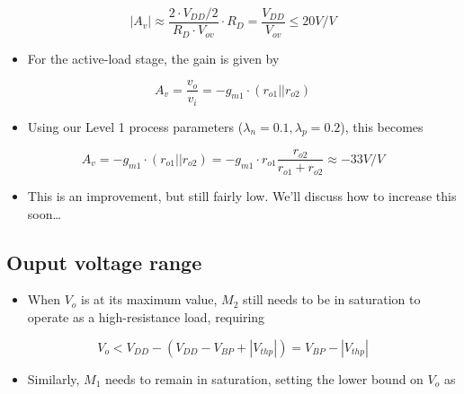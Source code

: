 \documentclass[11pt]{article}
\providecommand{\tightlist}{%
      \setlength{\itemsep}{0pt}\setlength{\parskip}{0pt}}
\begin{document}
\begin{equation}
|A_v| \approx \dfrac{2\cdot V_{DD}/2}{R_D\cdot V_{ov}}\cdot R_D = \dfrac{V_{DD}}{V_{ov}} \leq 20V/V
\end{equation}

\begin{itemize}
\tightlist
\item
  For the active-load stage, the gain is given by
\end{itemize}

\begin{equation}
A_v = \dfrac{v_o}{v_i} = -g_{m1} \cdot (r_{o1} || r_{o2})
\end{equation}

\begin{itemize}
\tightlist
\item
  Using our Level 1 process parameters
  (\(\lambda_n = 0.1, \lambda_p = 0.2\)), this becomes
\end{itemize}

\begin{equation}
A_v = -g_{m1} \cdot (r_{o1} || r_{o2}) = -g_{m1}\cdot r_{o1} \dfrac{r_{o2}}{r_{o1} + r_{o2}}\approx -33 V/V
\end{equation}

\begin{itemize}
\tightlist
\item
  This is an improvement, but still fairly low. We'll discuss how to
  increase this soon\ldots{}
\end{itemize}

    \hypertarget{ouput-voltage-range}{%
\subsection{Ouput voltage range}\label{ouput-voltage-range}}

    \begin{itemize}
\tightlist
\item
  When \(V_o\) is at its maximum value, \(M_2\) still needs to be in
  saturation to operate as a high-resistance load, requiring
\end{itemize}

\begin{equation}
V_o < V_{DD} - (V_{DD}  - V_{BP} + |V_{thp}|) = V_{BP} - |V_{thp}|
\end{equation}

\begin{itemize}
\tightlist
\item
  Similarly, \(M_1\) needs to remain in saturation, setting the lower
  bound on \(V_o\) as
\end{itemize}
\end{document}
